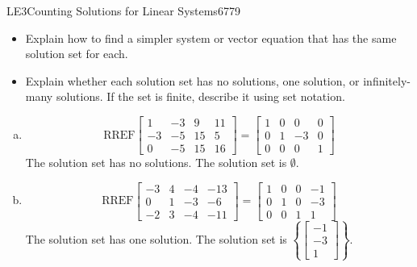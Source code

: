 \begin{exercise}{LE3}{Counting Solutions for Linear Systems}{6779}
\begin{exerciseStatement}
\begin{enumerate}[(a)]
 
\end{enumerate}

     

\begin{itemize}
\item  

 Explain how to find a simpler system or vector equation that has the same solution set for each. 

 
\item  

 Explain whether each solution set has no solutions, one solution, or infinitely-many solutions. If the set is finite, describe it using set notation. 

 
\end{itemize}

     \end{exerciseStatement}
 \begin{exerciseAnswer} 

\begin{enumerate}[(a)]
\item  

 \[\mathrm{RREF}\left[\begin{array}{ccc|c}
1 & -3 & 9 & 11 \\
-3 & -5 & 15 & 5 \\
0 & -5 & 15 & 16
\end{array}\right]=\left[\begin{array}{ccc|c}
1 & 0 & 0 & 0 \\
0 & 1 & -3 & 0 \\
0 & 0 & 0 & 1
\end{array}\right]\] The solution set has no solutions. The solution set is \(\emptyset\). 

 
\item  

 \[\mathrm{RREF}\left[\begin{array}{ccc|c}
-3 & 4 & -4 & -13 \\
0 & 1 & -3 & -6 \\
-2 & 3 & -4 & -11
\end{array}\right]=\left[\begin{array}{ccc|c}
1 & 0 & 0 & -1 \\
0 & 1 & 0 & -3 \\
0 & 0 & 1 & 1
\end{array}\right]\] The solution set has one solution. The solution set is \(\left\{ \left[\begin{array}{c}
-1 \\
-3 \\
1
\end{array}\right] \right\}\). 


\end{enumerate}
\end{exerciseAnswer}
\end{exercise}
